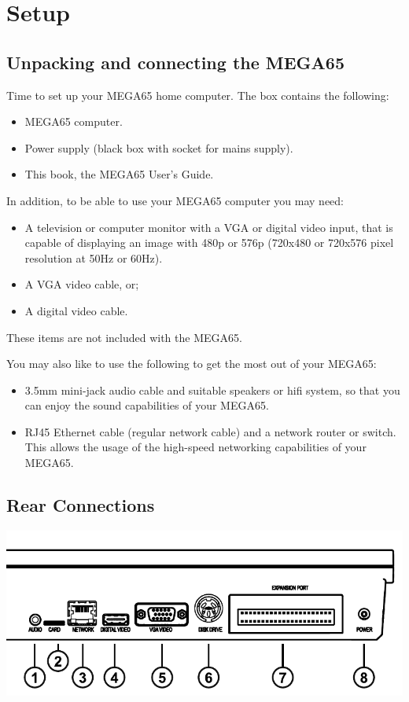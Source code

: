 \chapter{Setup}
\section{Unpacking and connecting the MEGA65}

Time to set up your MEGA65 home computer.
The box contains the following:
\begin{itemize}
\setlength\itemsep{-0.75mm}
\item MEGA65 computer.
\item Power supply (black box with socket for mains supply).
\item This book, the MEGA65 User's Guide.
\end{itemize}

In addition, to be able to use your MEGA65 computer you may need:
\begin{itemize}
	\item A television or computer monitor with a VGA or digital video input, that is capable of displaying an image with 480p or 576p (720x480 or 720x576 pixel resolution at 50Hz or 60Hz).
\item A VGA video cable, or;
\item A digital video cable.
\end{itemize}

These items are not included with the MEGA65.

You may also like to use the following to get the most out of your MEGA65:
\begin{itemize}
\item 3.5mm mini-jack audio cable and suitable speakers or hifi system, so that you can enjoy the sound capabilities of your MEGA65.
\item RJ45 Ethernet cable (regular network cable) and a network router or switch. This allows the usage of the high-speed networking capabilities of your MEGA65.
\end{itemize}

\section{Rear Connections}

\includegraphics[width=\linewidth]{images/illustrations/mega65-rear.pdf}

